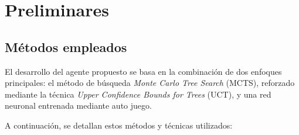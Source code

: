 \documentclass[conference,a4paper]{IEEEtran}
\begin{document}
\section{Preliminares}

\subsection{Métodos empleados}

El desarrollo del agente propuesto se basa en la combinación de dos enfoques principales: el método de búsqueda \emph{Monte Carlo Tree Search} (MCTS), 
reforzado mediante la técnica \emph{Upper Confidence Bounds for Trees} (UCT), y una red neuronal entrenada mediante auto juego. 

A continuación, se detallan estos métodos y técnicas utilizados:
\end{document}
